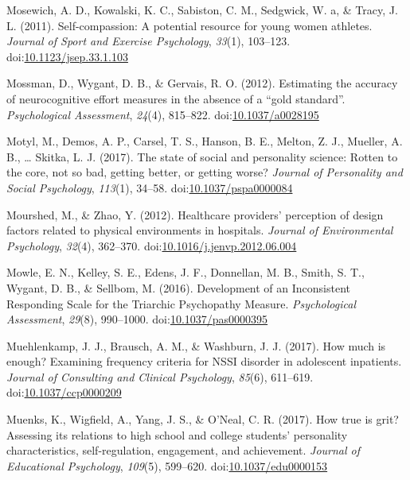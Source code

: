 \documentclass[english,man]{apa6}
\begin{document}
\hypertarget{ref-Mosewich2011}{}
Mosewich, A. D., Kowalski, K. C., Sabiston, C. M., Sedgwick, W. a, \&
Tracy, J. L. (2011). Self-compassion: A potential resource for young
women athletes. \emph{Journal of Sport and Exercise Psychology},
\emph{33}(1), 103--123.
doi:\href{https://doi.org/10.1123/jsep.33.1.103}{10.1123/jsep.33.1.103}

\hypertarget{ref-Mossman2012}{}
Mossman, D., Wygant, D. B., \& Gervais, R. O. (2012). Estimating the
accuracy of neurocognitive effort measures in the absence of a ``gold
standard''. \emph{Psychological Assessment}, \emph{24}(4), 815--822.
doi:\href{https://doi.org/10.1037/a0028195}{10.1037/a0028195}

\hypertarget{ref-Motyl2017}{}
Motyl, M., Demos, A. P., Carsel, T. S., Hanson, B. E., Melton, Z. J.,
Mueller, A. B., \ldots{} Skitka, L. J. (2017). The state of social and
personality science: Rotten to the core, not so bad, getting better, or
getting worse? \emph{Journal of Personality and Social Psychology},
\emph{113}(1), 34--58.
doi:\href{https://doi.org/10.1037/pspa0000084}{10.1037/pspa0000084}

\hypertarget{ref-Mourshed2012}{}
Mourshed, M., \& Zhao, Y. (2012). Healthcare providers' perception of
design factors related to physical environments in hospitals.
\emph{Journal of Environmental Psychology}, \emph{32}(4), 362--370.
doi:\href{https://doi.org/10.1016/j.jenvp.2012.06.004}{10.1016/j.jenvp.2012.06.004}

\hypertarget{ref-Mowle2016}{}
Mowle, E. N., Kelley, S. E., Edens, J. F., Donnellan, M. B., Smith, S.
T., Wygant, D. B., \& Sellbom, M. (2016). Development of an Inconsistent
Responding Scale for the Triarchic Psychopathy Measure.
\emph{Psychological Assessment}, \emph{29}(8), 990--1000.
doi:\href{https://doi.org/10.1037/pas0000395}{10.1037/pas0000395}

\hypertarget{ref-Muehlenkamp2017}{}
Muehlenkamp, J. J., Brausch, A. M., \& Washburn, J. J. (2017). How much
is enough? Examining frequency criteria for NSSI disorder in adolescent
inpatients. \emph{Journal of Consulting and Clinical Psychology},
\emph{85}(6), 611--619.
doi:\href{https://doi.org/10.1037/ccp0000209}{10.1037/ccp0000209}

\hypertarget{ref-Muenks2017}{}
Muenks, K., Wigfield, A., Yang, J. S., \& O'Neal, C. R. (2017). How true
is grit? Assessing its relations to high school and college students'
personality characteristics, self-regulation, engagement, and
achievement. \emph{Journal of Educational Psychology}, \emph{109}(5),
599--620.
doi:\href{https://doi.org/10.1037/edu0000153}{10.1037/edu0000153}
\end{document}
